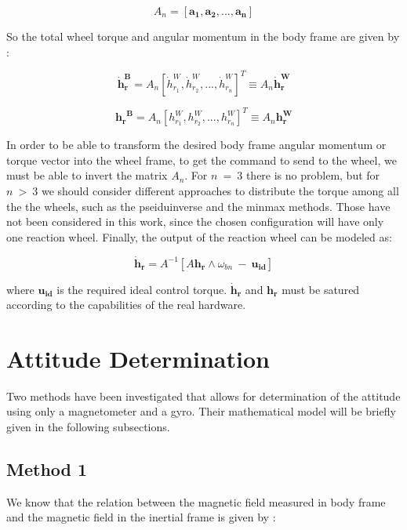 \documentclass[11pt,a4paper]{report}
\begin{document}
\begin{equation*}
 \mathit{A_{n}} = [\mathbf{a_{1}}, \mathbf{a_{2}},...,\mathbf{a_{n}}]
\end{equation*}

So the total wheel torque and angular momentum in the body frame are given by : 

\begin{equation}
 \mathbf{\dot{h}_{r}^B} = \mathit{A_{n}}[\mathit{\dot{h}_{r_{1}}^W},\mathit{\dot{h}_{r_{2}}^W},...,\mathit{\dot{h}_{r_{n}}^W}]^{T} \equiv \mathit{A_{n}} \mathbf{\dot{h}_{r}^W}
\end{equation}

\begin{equation}
 \mathbf{{h_{r}}^B} = \mathit{A_{n}}[\mathit{{h_{r_{1}}^W}},\mathit{{h_{r_{2}}^W}},...,\mathit{{h_{r_{n}}^W}}]^{T} \equiv \mathit{A_{n}} \mathbf{{h_{r}^W}}
\end{equation}

In order to be able to transform the desired body frame angular momentum or torque vector into the wheel frame, to get the command to send to the wheel, we must be able to invert the matrix $\mathit{A_{n}}$. For $n \ = \ 3$ there is no problem, but for $n \ > \ 3$ we should consider different approaches to distribute the torque among all the the wheels, such as the pseiduinverse and the minmax methods. Those have not been considered in this work, since the chosen configuration will have only one reaction wheel.
Finally, the output of the reaction wheel can be modeled as: 

\begin{equation}
 \mathbf{\dot{h}_r} = \mathit{A}^{-1} [A\mathbf{h_r} \wedge \omega_{bn} \ - \ \mathbf{u_{id}}]
\end{equation}

where $\mathbf{u_{id}}$ is the required ideal control torque. 
$\mathbf{\dot{h}_r}$ and $\mathbf{{h}_r}$ must be satured according to the capabilities of the real hardware.

\chapter{Attitude Determination} 
\label{chap:determination}
Two methods have been investigated that allows for determination of the attitude using only a magnetometer and a gyro. Their mathematical model will be briefly given in the following subsections.

\section{Method 1}
We know that the relation between the magnetic field measured in body frame and the magnetic field in the inertial frame is given by : 
\end{document}
